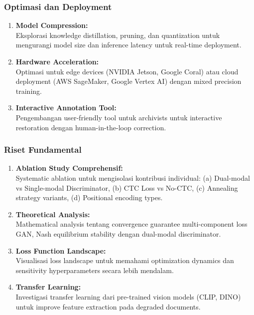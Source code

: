 \documentclass[12pt,a4paper]{article}
\begin{document}
\subsubsection{Optimasi dan Deployment}

\begin{enumerate}[label=\arabic*., leftmargin=0.5cm]
    \item \textbf{Model Compression:} \\
    Eksplorasi knowledge distillation, pruning, dan quantization untuk mengurangi model size dan inference latency untuk real-time deployment.
    
    \item \textbf{Hardware Acceleration:} \\
    Optimasi untuk edge devices (NVIDIA Jetson, Google Coral) atau cloud deployment (AWS SageMaker, Google Vertex AI) dengan mixed precision training.
    
    \item \textbf{Interactive Annotation Tool:} \\
    Pengembangan user-friendly tool untuk archivists untuk interactive restoration dengan human-in-the-loop correction.
\end{enumerate}

\subsubsection{Riset Fundamental}

\begin{enumerate}[label=\arabic*., leftmargin=0.5cm]
    \item \textbf{Ablation Study Comprehensif:} \\
    Systematic ablation untuk mengisolasi kontribusi individual: (a) Dual-modal vs Single-modal Discriminator, (b) CTC Loss vs No-CTC, (c) Annealing strategy variants, (d) Positional encoding types.
    
    \item \textbf{Theoretical Analysis:} \\
    Mathematical analysis tentang convergence guarantee multi-component loss GAN, Nash equilibrium stability dengan dual-modal discriminator.
    
    \item \textbf{Loss Function Landscape:} \\
    Visualisasi loss landscape untuk memahami optimization dynamics dan sensitivity hyperparameters secara lebih mendalam.
    
    \item \textbf{Transfer Learning:} \\
    Investigasi transfer learning dari pre-trained vision models (CLIP, DINO) untuk improve feature extraction pada degraded documents.
\end{enumerate}
\end{document}

